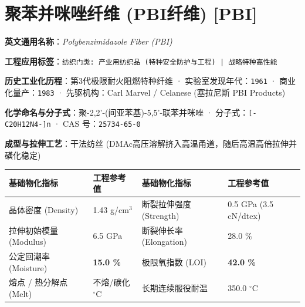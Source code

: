 \documentclass[11pt,openright,twoside,UTF8]{ctexbook}
\begin{document}
\section{聚苯并咪唑纤维 (PBI纤维) [PBI]}
\label{sec:pbi}

\noindent\textbf{英文通用名称}：\textit{Polybenzimidazole Fiber (PBI)}\par
\noindent\textbf{工程应用标签}：\texttt{纺织门类: 产业用纺织品 (特种安全防护与工程) | 战略特种高性能}\par
\noindent\textbf{历史工业化历程}：第3代极限耐火阻燃特种纤维 · 实验室发现年代：\texttt{1961} · 商业化量产：\texttt{1983} · 先驱机构：Carl Marvel / Celanese (塞拉尼斯 PBI Products)\par
\noindent\textbf{化学命名与分子式}：聚-2,2'-(间亚苯基)-5,5'-联苯并咪唑 · 分子式：\texttt{[-C20H12N4-]n} · CAS 号：\texttt{25734-65-0}\par
\noindent\textbf{成型与拉伸工艺}：干法纺丝 (DMAc高压溶解挤入高温甬道，随后高温高倍拉伸并磺化稳定)\par

\vspace{0.15cm}
\begin{center}
\small
\begin{tabularx}{\textwidth}{p{3.8cm}Xp{3.8cm}X}
\toprule
\textbf{基础物化指标} & \textbf{工程参考值} & \textbf{基础物化指标} & \textbf{工程参考值} \\
\midrule
晶体密度 (Density) & 1.43 g/cm$^3$ & 断裂拉伸强度 (Strength) & 0.5 GPa (3.5 cN/dtex) \\
拉伸初始模量 (Modulus) & 6.5 GPa & 断裂伸长率 (Elongation) & 28.0 \% \\
公定回潮率 (Moisture) & \textbf{15.0 \%} & 极限氧指数 (LOI) & \textbf{42.0 \%} \\
熔点 / 热分解点 (Melt) & 不熔/碳化 $^\circ\mathrm{C}$ & 长期连续服役耐温 & 350.0 $^\circ\mathrm{C}$ \\
\bottomrule
\end{tabularx}
\end{center}
\vspace{0.15cm}
\end{document}
